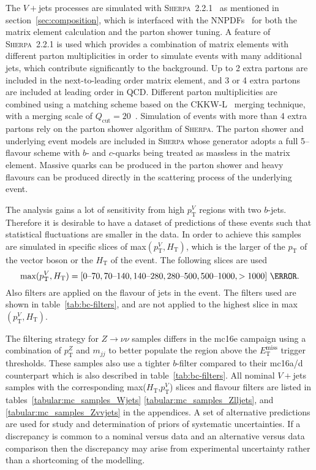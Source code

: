 The $V+$jets processes are simulated with
\textsc{Sherpa}~2.2.1~\cite{1126-6708-2009-02-007} as mentioned in
section~\ref{sec:composition}, which is interfaced with the
NNPDFs~\cite{Ball:2012cx} for both the matrix element calculation and the parton shower
tuning. A feature of \textsc{Sherpa}~2.2.1 is used which provides a combination
of matrix elements with different parton multiplicities in order to simulate
events with many additional jets, which contribute significantly to the
background. Up to 2 extra partons are included in the next-to-leading order
matrix element, and 3 or 4 extra partons are included at leading order in QCD.
Different parton multiplicities are combined using  a matching scheme based on
the CKKW-L~\cite{Lonnblad:2001iq, Lavesson:2005xu} merging technique, with a
merging scale of $Q_{\text{cut}}=20$~\GeV. Simulation of events with more than 4
extra partons rely on the parton shower algorithm of \textsc{Sherpa}. The parton
shower and underlying event models are included in \textsc{Sherpa} whose
generator adopts a full 5--flavour scheme with $b$- and $c$-quarks being treated
as massless in the matrix element. Massive quarks can be produced in the parton
shower and heavy flavours can be produced directly in the scattering process of
the underlying event.

The analysis gains a lot of sensitivity from high $p_{\mathrm{T}}^V$ regions
with two $b$-jets. Therefore it is desirable to have a dataset of predictions
of these events such that statistical fluctuations are smaller in the data. In
order to achieve this samples are simulated in specific slices of
max$(p_{\mathrm{T}}^V, H_{\mathrm{T}})$, which is the larger of the
$p_{\mathrm{T}}$ of the vector boson or the $H_{\mathrm{T}}$ of the event.
The following slices are used
\begin{equation*}
  \text{max}(p_{\mathrm{T}}^V, H_{\mathrm{T}}) =
  [0\text{--}70, 70\text{--}140, 140\text{--}280,
  280\text{--}500, 500\text{--}1000, >1000]~\GeV.
\end{equation*}
Also filters are applied on the flavour of jets in the event. The filters used
are shown in table~\ref{tab:bc-filters}, and are not applied to the highest
slice in max$(p_{\mathrm{T}}^V, H_{\mathrm{T}})$.

The filtering strategy for $Z\to\nu\nu$ samples differs in the mc16e campaign using
a combination of $p_{\mathrm{T}}^Z$ and $m_{jj}$ to better populate the region above the
$E_{\mathrm{T}}^{\text{miss}}$ trigger thresholds. These samples also use a
tighter $b$-filter compared to their mc16a/d counterpart which is also described
in table~\ref{tab:bc-filters}. All nominal $V+$jets samples with the
corresponding max($H_{\mathrm{T}}$,$p_{\mathrm{T}}^V$) slices and flavour
filters are listed in tables~\ref{tabular:mc_samples_Wjets}
\ref{tabular:mc_samples_Zlljets}, and
\ref{tabular:mc_samples_Zvvjets} in the appendices. A set of alternative
predictions are used for study and determination of priors of systematic
uncertainties. If a discrepancy is common to a nominal versus data and an
alternative versus data comparison then the discrepancy may arise from
experimental uncertainty rather than a shortcoming of the modelling.

